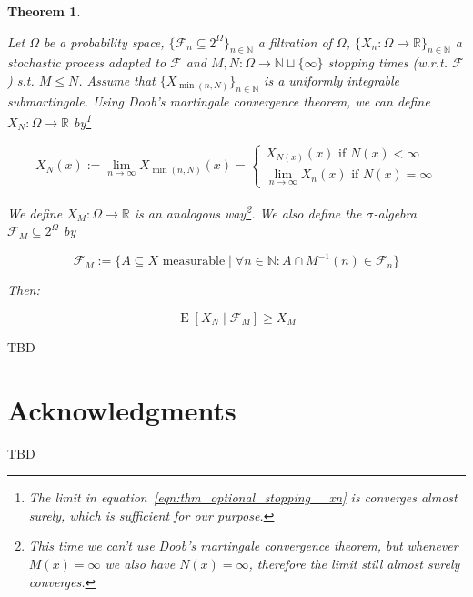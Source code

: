 \documentclass[11pt]{article}
\theoremstyle{definition}
\theoremstyle{plain}
\newtheorem{theorem}{Theorem}%
\newcommand{\Nats}{\mathbb{N}}
\newcommand{\Reals}{\mathbb{R}}
\newcommand{\Sq}[2]{\{#1\}_{#2 \in \Nats}}
\newcommand{\Sqn}[1]{\Sq{#1}{n}}
\DeclareMathOperator{\E}{E}
\newcommand{\F}{\mathcal{F}}
\begin{document}
\begin{samepage}
\begin{theorem}
\label{thm:optional_stopping}

Let ${\Omega}$ be a probability space, ${\Sqn{\F_n \subseteq 2^\Omega}}$ a filtration of ${\Omega}$, ${\Sqn{X_n: \Omega \rightarrow \Reals}}$ a stochastic process adapted to ${\F}$ and ${M,N: \Omega \rightarrow \Nats \sqcup \{\infty\}}$ stopping times (w.r.t. ${\F}$) s.t. ${M \leq N}$. Assume that ${\Sqn{X_{\min(n,N)}}}$ is a uniformly integrable submartingale. Using Doob's martingale convergence theorem, we can define ${X_N : \Omega \rightarrow \Reals}$ by\footnote{The limit in equation~\ref{eqn:thm_optional_stopping__xn} is converges \emph{almost} surely, which is sufficient for our purpose.}

\begin{equation}
\label{eqn:thm_optional_stopping__xn}
X_N(x):=\lim_{n \rightarrow \infty} X_{\min(n,N)}(x)=\begin{cases}X_{N(x)}(x) \text{ if } N(x) < \infty\\\lim_{n \rightarrow \infty} X_n(x) \text{ if } N(x) = \infty\end{cases}
\end{equation}

We define ${X_M: \Omega \rightarrow \Reals}$ is an analogous way\footnote{This time we can't use Doob's martingale convergence theorem, but whenever ${M(x) = \infty}$ we also have ${N(x) = \infty}$, therefore the limit still almost surely converges.}. We also define the $\sigma$-algebra ${\F_M \subseteq 2^\Omega}$ by

\begin{equation}
\F_M:=\{A \subseteq X \text{ measurable} \mid \forall n \in \Nats: A \cap M^{-1}(n) \in \F_n\}
\end{equation}

Then:

\begin{equation}
\E[X_N \mid \F_M] \geq X_M
\end{equation}

\end{theorem}
\end{samepage}

TBD

\section*{Acknowledgments}

TBD



\end{document}
